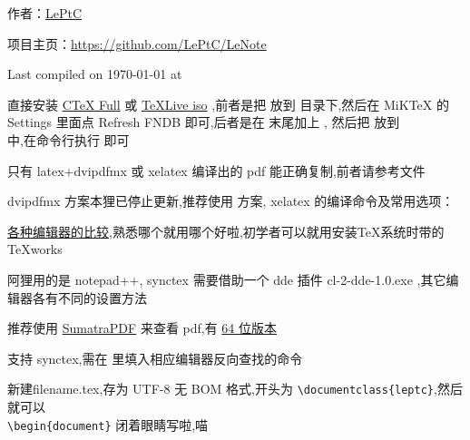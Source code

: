 \documentclass{leptc}
\begin{document}

作者：\href{mailto:alileptc@gmail.com}{LePtC}

项目主页：\url{https://github.com/LePtC/LeNote }

Last compiled on {\yyyymmdddate\today} at \currenttime



 直接安装 \href{http://www.ctex.org/CTeXDownload }{CTeX Full} 或 \href{http://www.ctan.org/tex-archive/systems/texlive/Images/ }{TeXLive iso} ,前者是把  放到  目录下,然后在 MiKTeX 的 Settings 里面点 Refresh FNDB 即可,后者是在  末尾加上 , 然后把 放到 \\  中,在命令行执行  即可

只有 latex+dvipdfmx 或 xelatex 编译出的 pdf 能正确复制,前者请参考文件 

dvipdfmx 方案本狸已停止更新,推荐使用 \XeTeX 方案, xelatex 的编译命令及常用选项：



 \href{http://tex.stackexchange.com/questions/339/latex-editors-ides }{各种编辑器的比较},熟悉哪个就用哪个好啦,初学者可以就用安装\TeX 系统时带的 TeXworks 

阿狸用的是 notepad++, synctex 需要借助一个 dde 插件 cl-2-dde-1.0.exe ,其它编辑器各有不同的设置方法

 推荐使用 \href{http://blog.kowalczyk.info/software/sumatrapdf/download-free-pdf-viewer-cn.html }{SumatraPDF} 来查看 pdf,有 \href{http://xhmikosr.1f0.de/sumatrapdf/ }{64 位版本}

支持 synctex,需在  里填入相应编辑器反向查找的命令

新建filename.tex,存为 UTF-8 无 BOM 格式,开头为 \verb|\documentclass{leptc}|,然后就可以 \\ \verb|\begin{document}| 闭着眼睛写啦,喵 \tld
\end{document}
